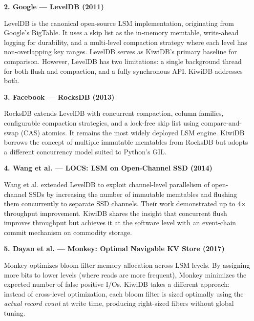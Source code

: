 \documentclass[oneside,a4paper,12pt]{book}
\begin{document}
\vspace{1\baselineskip}

\textbf{2. Google --- LevelDB (2011) \cite{c7}}

LevelDB is the canonical open-source LSM implementation, originating from Google's BigTable. It uses a skip list as the in-memory memtable, write-ahead logging for durability, and a multi-level compaction strategy where each level has non-overlapping key ranges. LevelDB serves as KiwiDB's primary baseline for comparison. However, LevelDB has two limitations: a single background thread for both flush and compaction, and a fully synchronous API. KiwiDB addresses both.

\vspace{1\baselineskip}

\textbf{3. Facebook --- RocksDB (2013) \cite{c8}}

RocksDB extends LevelDB with concurrent compaction, column families, configurable compaction strategies, and a lock-free skip list using compare-and-swap (CAS) atomics. It remains the most widely deployed LSM engine. KiwiDB borrows the concept of multiple immutable memtables from RocksDB but adopts a different concurrency model suited to Python's GIL.

\vspace{1\baselineskip}

\textbf{4. Wang et al. --- LOCS: LSM on Open-Channel SSD (2014) \cite{c9}}

Wang et al. extended LevelDB to exploit channel-level parallelism of open-channel SSDs by increasing the number of immutable memtables and flushing them concurrently to separate SSD channels. Their work demonstrated up to 4$\times$ throughput improvement. KiwiDB shares the insight that concurrent flush improves throughput but achieves it at the software level with an event-chain commit mechanism on commodity storage.

\vspace{1\baselineskip}

\textbf{5. Dayan et al. --- Monkey: Optimal Navigable KV Store (2017) \cite{c10}}

Monkey optimizes bloom filter memory allocation across LSM levels. By assigning more bits to lower levels (where reads are more frequent), Monkey minimizes the expected number of false positive I/Os. KiwiDB takes a different approach: instead of cross-level optimization, each bloom filter is sized optimally using the \emph{actual record count} at write time, producing right-sized filters without global tuning.
\end{document}
